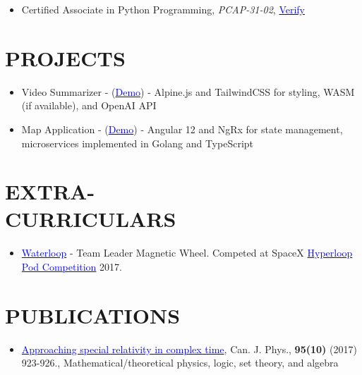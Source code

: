 \documentclass[margin]{res}
\begin{document}
\begin{resume}
\begin{itemize}
		\item Certified Associate in Python Programming, \textit{PCAP-31-02},
		      \href{https://www.youracclaim.com/badges/bfd6aae6-1ab4-461b-8a62-f25cfb0bd29d}{\textcolor{blue}{Verify}}

	\end{itemize}

	\section{\textcolor{NavyBlue}{PROJECTS}}
	\begin{itemize}
 		\item Video Summarizer - (\href{https://video-summarizer.pages.dev/}{\textcolor{blue}{Demo}}) - Alpine.js and TailwindCSS
		 for styling, WASM (if available), and OpenAI API

		 \item 	Map Application - (\href{https://tripsultant.com}{\textcolor{blue}{Demo}}) - Angular 12 and NgRx
		 for state management, microservices implemented in Golang and TypeScript
	\end{itemize}

	\section{\textcolor{NavyBlue}{EXTRA- \\ CURRICULARS}}
	\begin{itemize} \itemsep -2pt %
		\item \href{https://teamwaterloop.ca/}{\textcolor{blue}{Waterloop}} - Team Leader Magnetic Wheel. Competed at SpaceX \href{https://en.wikipedia.org/wiki/Hyperloop_pod_competition}{\textcolor{blue}{Hyperloop Pod Competition}} 2017.
	\end{itemize}

	\section{\textcolor{NavyBlue}{PUBLICATIONS}}
	\begin{itemize}
		\item \href{https://www.nrcresearchpress.com/doi/abs/10.1139/cjp-2017-0089?journalCode=cjp#.X3Z1_GhKiUk}{\textcolor{blue}{Approaching special relativity in complex time}}, Can. J. Phys., \textbf{95(10)} (2017) 923-926., Mathematical/theoretical physics, logic, set theory, and algebra
	\end{itemize}


\end{resume}
\end{document}
